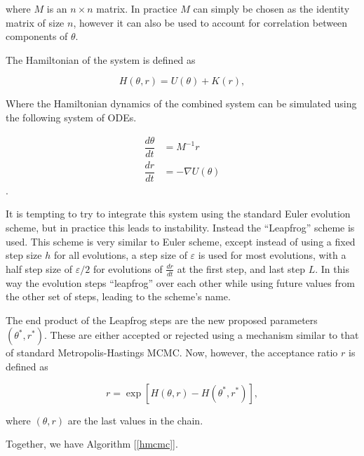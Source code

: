     where $M$ is an $n \times n$ matrix. In practice $M$ can simply be chosen as the identity matrix of size $n$, however it can also be used to account for correlation between components of $\theta$.

    The Hamiltonian of the system is defined as

    \begin{equation}
        H(\theta,r) = U(\theta) + K(r),
    \end{equation}

    Where the Hamiltonian dynamics of the combined system can be simulated using the following system of ODEs.

    \begin{equation}
        \begin{array}{rl}
        \displaystyle
            \dfrac{d\theta}{dt} & = M^{-1} r \\
            \dfrac{dr}{dt} & = - \nabla U(\theta)
        \end{array}
    \end{equation}.

    It is tempting to try to integrate this system using the standard Euler evolution scheme, but in practice this leads to instability. Instead the ``Leapfrog'' scheme is used. This scheme is very similar to Euler scheme, except instead of using a fixed step size $h$ for all evolutions, a step size of $\varepsilon$ is used for most evolutions, with a half step size of $\varepsilon / 2$ for evolutions of $\frac{dr}{dt}$ at the first step, and last step $L$. In this way the evolution steps ``leapfrog'' over each other while using future values from the other set of steps, leading to the scheme's name.

    The end product of the Leapfrog steps are the new proposed parameters $(\theta^*,r^*)$. These are either accepted or rejected using a mechanism similar to that of standard Metropolis-Hastings MCMC. Now, however, the acceptance ratio $r$ is defined as

    \begin{equation}
        r = \exp \left[ H(\theta,r) - H(\theta^*,r^*) \right],
    \end{equation}

    where $(\theta,r)$ are the last values in the chain.

    Together, we have Algorithm [\ref{hmcmc}].

